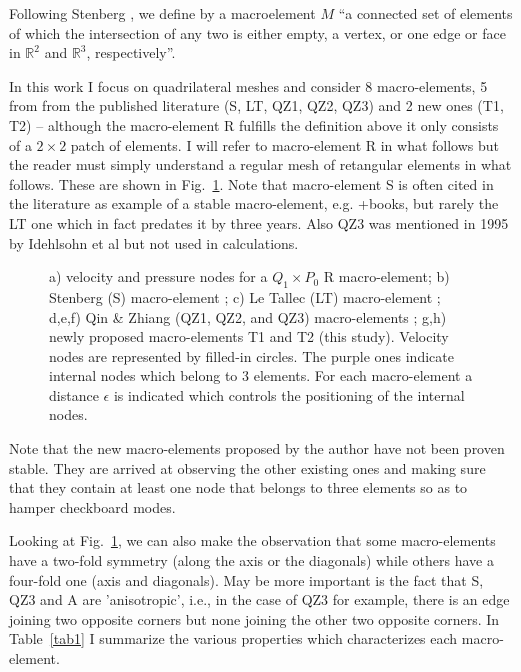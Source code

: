\documentclass[a4paper,12pt]{article}
\begin{document}

Following Stenberg \cite{sten90}, we define by a macroelement $M$ ``a connected set of elements of which the 
intersection of any two is either empty, a vertex, or one edge or face in $\mathbb{R}^2$ 
and $\mathbb{R}^3$, respectively''.

In this work I focus on quadrilateral meshes and consider 8 
macro-elements, 5 from from the published literature (S, LT, QZ1, QZ2, QZ3) and 2 new ones (T1, T2) -- although 
the macro-element R fulfills the definition above it only consists of a $2\times 2$ patch of elements.
I will refer to macro-element R in what follows but the reader must simply understand a regular 
mesh of retangular elements in what follows.
These are shown in Fig.~\ref{fig:mes}.
Note that macro-element S is often cited in the literature as example of a stable macro-element, 
e.g. \cite{chba93}+books\cite{elsw}, but rarely the LT one which in fact predates it by three years. 
Also QZ3 was mentioned in 1995 by Idehlsohn et al \cite{idsn95} but not used in calculations. 

\begin{figure}[t]

\caption{
a) velocity and pressure nodes for a $Q_1\times P_0$ R macro-element;
b) Stenberg (S) macro-element \cite{sten84}; 
c) Le Tallec (LT) macro-element \cite{leta81,leru86}; 
d,e,f) Qin \& Zhiang (QZ1, QZ2, and QZ3) macro-elements \cite{qizh07}; 
g,h) newly proposed macro-elements T1 and T2 (this study).
Velocity nodes are represented by filled-in circles. The purple ones indicate internal nodes which belong to 3 elements.
For each macro-element a distance $\epsilon$ is indicated which controls the positioning of the internal nodes.
\label{fig:mes}}
\end{figure}

Note that the new macro-elements proposed by the author have not been proven stable. They are arrived at 
observing the other existing ones and making sure that they contain at least one node that belongs to three 
elements so as to hamper checkboard modes.


Looking  at Fig.~\ref{fig:mes}, we can also make the observation that some macro-elements 
have a two-fold symmetry (along the axis or the diagonals) while others have a four-fold one 
(axis and diagonals). May be more important is the fact that S, QZ3 and A are 'anisotropic', i.e., in 
the case of QZ3 for example, there is an edge joining two opposite corners but none joining the 
other two opposite corners.
In Table~\ref{tab1} I summarize the various properties which characterizes each macro-element.
\end{document}
